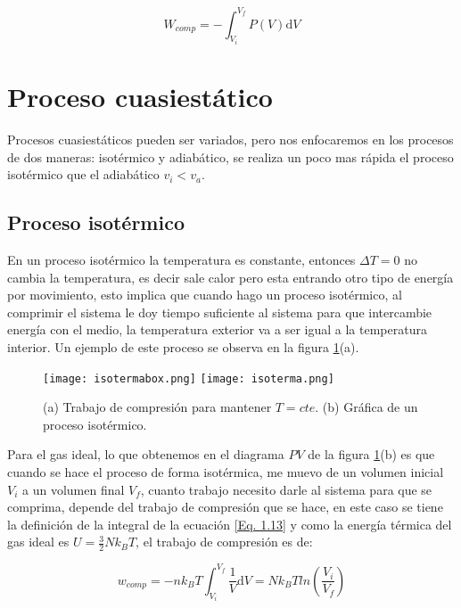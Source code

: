 \documentclass[11pt,fleqn]{book}
\begin{document}
\begin{equation}
    W_{comp}=-\int_{V_{i}}^{V_{f}}P(V)\mathrm{d}V
    \label{Eq. 1.13}
\end{equation}

\section{Proceso cuasiestático}

Procesos cuasiestáticos pueden ser variados, pero nos enfocaremos en los procesos de dos maneras: isotérmico y adiabático, se realiza un poco mas rápida el proceso isotérmico que el adiabático $v_{i}<v_{a}$.

\subsection{Proceso isotérmico}

En un proceso isotérmico la temperatura es constante, entonces $\Delta T=0$ no cambia la temperatura, es decir sale calor pero esta entrando otro tipo de energía por movimiento, esto implica que cuando hago un proceso isotérmico, al comprimir el sistema le doy tiempo suficiente al sistema para que intercambie energía con el medio, la temperatura exterior va a ser igual a la temperatura interior. Un ejemplo de este proceso se observa en la figura \ref{Fig. 1.5}(a).

\begin{figure}[H]
    \centering
    \texttt{[image: isotermabox.png]}\hspace{5mm}
    \texttt{[image: isoterma.png]}
    \caption{(a) Trabajo de compresión para mantener $T=cte$. (b) Gráfica de un proceso isotérmico.}
    \label{Fig. 1.5}
\end{figure} 

Para el gas ideal, lo que obtenemos en el diagrama $PV$ de la figura \ref{Fig. 1.5}(b) es que cuando se hace el proceso de forma isotérmica, me muevo de un volumen inicial $V_{i}$ a un volumen final $V_{f}$, cuanto trabajo necesito darle al sistema para que se comprima, depende del trabajo de compresión que se hace, en este caso se tiene la definición de la integral de la ecuación \ref{Eq. 1.13} y como la energía térmica del gas ideal es $U=\frac{3}{2}Nk_{B}T$, el trabajo de compresión es de:

\begin{equation}
    w_{comp}=-nk_{B}T\int_{V_{i}}^{V_{f}}\frac{1}{V}\mathrm{d}V=Nk_{B}Tln\left(\frac{V_{i}}{V_{f}}\right)
    \label{Eq. 1.14}
\end{equation}
\end{document}
